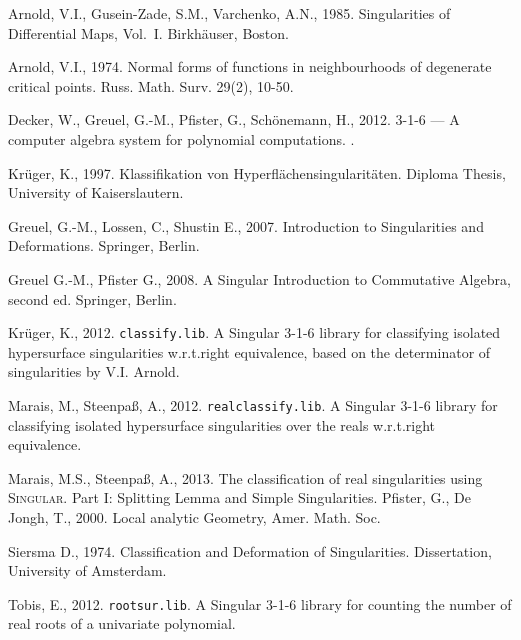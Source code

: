 \documentclass[noend]{amsproc}
\theoremstyle{definition}
\begin{document}
\begin{thebibliography}{99}
Arnold, V.I., Gusein-Zade, S.M., Varchenko, A.N., 1985.
Singularities of Differential Maps, Vol.~I.
Birkh\"auser, Boston.

Arnold, V.I., 1974.
Normal forms of functions in neighbourhoods of degenerate critical points.
Russ. Math. Surv. 29(2), 10-50.

Decker, W., Greuel, G.-M., Pfister, G., Sch{\"o}nemann, H., 2012.
 {3-1-6} --- {A} computer algebra system for polynomial
computations.
.

Kr\"uger, K., 1997.
Klassifikation von Hyperfl\"achensingularit\"aten.
Diploma Thesis, University of Kaiserslautern.

Greuel, G.-M., Lossen, C., Shustin E., 2007.
Introduction to Singularities and Deformations.
Springer, Berlin.

Greuel G.-M., Pfister G., 2008.
A Singular Introduction to Commutative Algebra, second ed.
Springer, Berlin.

Kr\"uger, K., 2012.
{\tt classify.lib}. {A} {\sc Singular} {3-1-6} library for classifying isolated
hypersurface singularities w.r.t.\@ right equivalence, based on the
determinator of singularities by V.I. Arnold.

Marais, M., Steenpa\ss, A., 2012.
{\tt realclassify.lib}. {A} {\sc Singular} {3-1-6} library for classifying
isolated hypersurface singularities over the reals w.r.t.\@ right equivalence.

Marais, M.S., Steenpa\ss, A., 2013.
The classification of real singularities using \textsc{Singular}. Part I: Splitting Lemma and Simple Singularities.
Pfister, G., De Jongh, T., 2000.
Local analytic Geometry, Amer. Math. Soc.

Siersma D., 1974.
Classification and Deformation of Singularities.
Dissertation, University of Amsterdam.

Tobis, E., 2012.
{\tt rootsur.lib}. {A} {\sc Singular} {3-1-6} library for counting the number
of real roots of a univariate polynomial.
\end{thebibliography}
\end{document}
